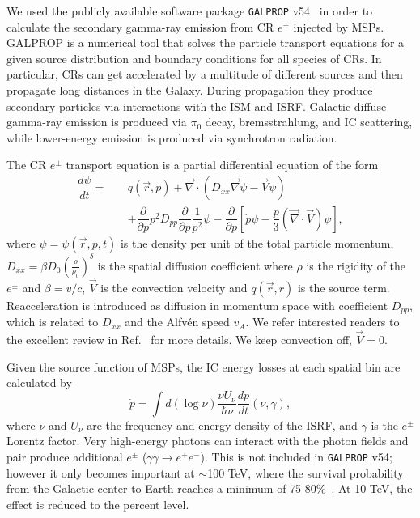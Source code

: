 \documentclass[doublespace,draft,nopageskip]{VTthesis} %
\begin{document}
We used the publicly available software package \texttt{GALPROP} v54~\cite{Galprop,Galpropsupplementary} in order to calculate the secondary gamma-ray emission from CR $e^\pm$ injected by MSPs. GALPROP is a numerical tool that solves the particle transport equations for a given source distribution and boundary conditions for all species of CRs. In particular, CRs can get accelerated by a multitude of different sources and then propagate long distances in the Galaxy. During propagation they produce secondary particles via interactions with the ISM and ISRF. Galactic diffuse gamma-ray emission is produced via $\pi_0$ decay, bremsstrahlung, and IC scattering, while lower-energy emission is produced via synchrotron radiation.

The CR $e^\pm$ transport equation is a partial differential equation of the form
\begin{eqnarray}
  \label{eq:prop_eq}
  \dfrac{d\psi}{dt} =\ &&q(\vec{r},p)+\vec{\nabla}\cdot(D_{xx}\vec{\nabla}\psi-\vec{V}\psi)\nonumber\\
                       &&+\dfrac{\partial}{\partial p}p^2D_{pp}\dfrac{\partial}{\partial p}\dfrac{1}{p^2}\psi-\dfrac{\partial}{\partial p}[\dot{p}\psi-\dfrac{p}{3}(\vec{\nabla}\cdot\vec{V})\psi],
\end{eqnarray}
where $\psi = \psi(\vec{r},p,t)$ is the density per unit of the total particle momentum, $D_{xx} = \beta D_0 (\frac{\rho}{\rho_0})^\delta$ is the spatial diffusion coefficient where $\rho$ is the rigidity of the $e^\pm$ and $\beta = v/c$, $\vec{V}$ is the convection velocity and $q(\vec{r},r)$ is the source term. Reacceleration is introduced as diffusion in momentum space with coefficient $D_{pp}$, which is related to $D_{xx}$ and the Alfv\'{e}n speed $v_A$. We refer interested readers to the excellent review in Ref.~\cite{Strong:2007nh} for more details. We keep convection off, $\vec{V}=0$.

Given the source function of MSPs, the IC energy losses at each spatial bin are calculated by
\begin{equation}
  \dot{p} = \int d(\log{\nu})\dfrac{\nu U_\nu}{\hbar \nu}\dfrac{dp}{dt}(\nu,\gamma),
\end{equation}
where $\nu$ and $U_\nu$ are the frequency and energy density of the ISRF, and $\gamma$ is the $e^\pm$ Lorentz factor. Very high-energy photons can interact with the photon fields and pair produce additional $e^\pm$ ($\gamma\gamma \to e^+e^-$). This is not included in \texttt{GALPROP} v54; however it only becomes important at $\sim$100 TeV, where the survival probability from the Galactic center to Earth reaches a minimum of 75-80\%~\cite{Moskalenko:2005ng}. At 10 TeV, the effect is reduced to the percent level.
\end{document}
